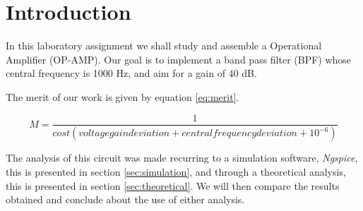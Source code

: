 \section{Introduction}
\label{sec:introduction}

\par In this laboratory assignment we shall study and assemble a Operational Amplifier (OP-AMP). Our goal is to implement a band pass filter (BPF) whose central frequency is 1000 Hz, and aim for a gain of 40 dB.

\par The merit of our work is given by equation \ref{eq:merit}.



\begin{equation}
    M = \frac{1}{cost ( voltagegaindeviation + centralfrequencydeviation + 10^{-6})}
    \label{eq:merit}
\end{equation}




The analysis of this circuit was made recurring to a simulation software, \emph{Ngspice}, this is presented in section \ref{sec:simulation}, and through a theoretical analysis, this is presented in section \ref{sec:theoretical}. We will then compare the results obtained and conclude about the use of either analysis.

